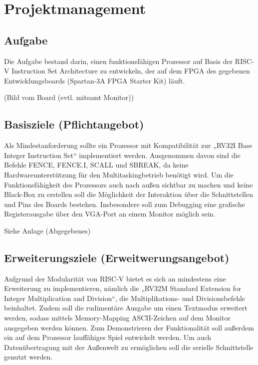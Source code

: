 \chapter{Projektmanagement}

\section{Aufgabe}

Die Aufgabe bestand darin, einen funktionsfähigen Prozessor auf Basis der RISC-V Instruction Set Architecture zu entwickeln, der auf dem FPGA des gegebenen Entwicklungsboards (Spartan-3A FPGA Starter Kit) läuft. 

(Bild vom Board (evtl. mitsamt Monitor))


\section{Basisziele (Pflichtangebot)}
Als Mindestanforderung sollte ein Prozessor mit Kompatibilität zur „RV32I Base Integer Instruction Set“ implementiert werden. Ausgenommen davon sind die Befehle FENCE, FENCE.I, SCALL und SBREAK, da keine Hardwareunterstützung für den Multitaskingbetrieb benötigt wird.
Um die Funktionsfähigkeit des Prozessors auch nach außen sichtbar zu machen und keine Black-Box zu erstellen soll die Möglichkeit der Interaktion über die Schnittstellen und Pins des Boards bestehen. Insbesondere soll zum Debugging eine grafische Registerausgabe über den VGA-Port an einem Monitor möglich sein.

Siehe Anlage (Abgegebenes)


\section{Erweiterungsziele (Erweitwerungsangebot)}
Aufgrund der Modularität von RISC-V bietet es sich an mindestens eine Erweiterung zu implementieren, nämlich die „RV32M Standard Extension for Integer Multiplication and Division“, die Multiplikations- und Divisionsbefehle beinhaltet. Zudem soll die rudimentäre Ausgabe um einen Textmodus erweitert werden, sodass mittels Memory-Mapping ASCII-Zeichen auf dem Monitor ausgegeben werden können. Zum Demonstrieren der Funktionalität soll außerdem ein auf dem Prozessor lauffähiges Spiel entwickelt werden. Um auch Datenübertragung mit der Außenwelt zu ermöglichen soll die serielle Schnittstelle genutzt werden.

